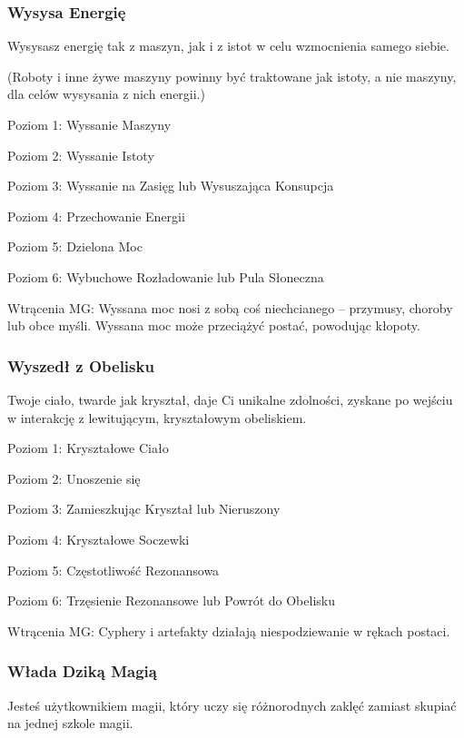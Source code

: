 \subsubsection{Wysysa Energię}

Wysysasz energię tak z maszyn, jak i z istot w celu wzmocnienia samego siebie.

(Roboty i inne żywe maszyny powinny być traktowane jak istoty, a nie maszyny, dla celów wysysania z nich energii.)

Poziom 1: Wyssanie Maszyny

Poziom 2: Wyssanie Istoty

Poziom 3: Wyssanie na Zasięg lub Wysuszająca Konsupcja

Poziom 4: Przechowanie Energii

Poziom 5: Dzielona Moc

Poziom 6: Wybuchowe Rozładowanie lub Pula Słoneczna

Wtrącenia MG: Wyssana moc nosi z sobą coś niechcianego – przymusy, choroby lub obce myśli. Wyssana moc może przeciążyć postać, powodując kłopoty.

\subsubsection{Wyszedł z Obelisku}

Twoje ciało, twarde jak kryształ, daje Ci unikalne zdolności, zyskane po wejściu w interakcję z lewitującym, kryształowym obeliskiem.

Poziom 1: Kryształowe Ciało

Poziom 2: Unoszenie się

Poziom 3: Zamieszkując Kryształ lub Nieruszony

Poziom 4: Kryształowe Soczewki

Poziom 5: Częstotliwość Rezonansowa

Poziom 6: Trzęsienie Rezonansowe lub Powrót do Obelisku

Wtrącenia MG: Cyphery i artefakty działają niespodziewanie w rękach postaci. 

\subsubsection{Włada Dziką Magią}

Jesteś użytkownikiem magii, który uczy się różnorodnych zaklęć zamiast skupiać na jednej szkole magii.

